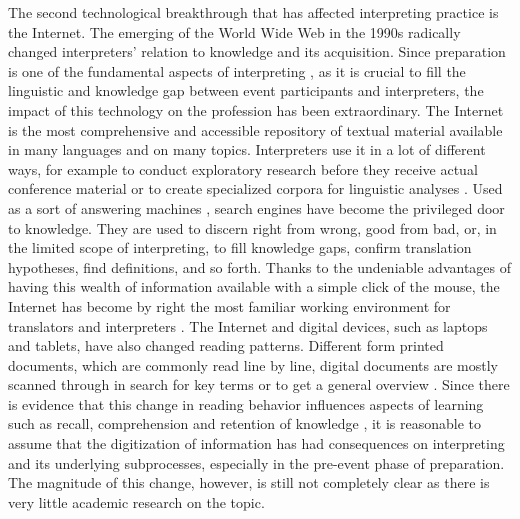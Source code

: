 \documentclass[output=paper]{langsci/langscibook}
\begin{document}
The second technological breakthrough that has affected interpreting practice is the Internet. The emerging of the World Wide Web in the 1990s radically changed interpreters’ relation to knowledge and its acquisition. Since preparation is one of the fundamental aspects of interpreting \citep{Gile2009}, as it is crucial to fill the linguistic and knowledge gap between event participants and interpreters, the impact of this technology on the profession has been extraordinary. The Internet is the most comprehensive and accessible repository of textual material available in many languages and on many topics. Interpreters use it in a lot of different ways, for example to conduct exploratory research before they receive actual conference material \citep{chang_conference_2018} or to create specialized corpora for linguistic analyses \citep{Fantinuoli2017a,Fantinuoli2018c,xu_corpus-based_2018}. Used as a sort of answering machines \citep{finn_what_2017}, search engines have become the privileged door to knowledge. They are used to discern right from wrong, good from bad, or, in the limited scope of interpreting, to fill knowledge gaps, confirm translation hypotheses, find definitions, and so forth. Thanks to the undeniable advantages of having this wealth of information available with a simple click of the mouse, the Internet has become by right the most familiar working environment for translators and interpreters \citep{zanettin_corpora_2002}. The Internet and digital devices, such as laptops and tablets, have also changed reading patterns. Different form printed documents, which are commonly read line by line, digital documents are mostly scanned through in search for key terms or to get a general overview \citep{pernice_f-shaped_2017}. Since there is evidence that this change in reading behavior influences aspects of learning such as recall, comprehension and retention of knowledge \citep{ross_print_2017}, it is reasonable to assume that the digitization of information has had consequences on interpreting and its underlying subprocesses, especially in the pre-event phase of preparation. The magnitude of this change, however, is still not completely clear as there is very little academic research on the topic.  
 
\end{document}

